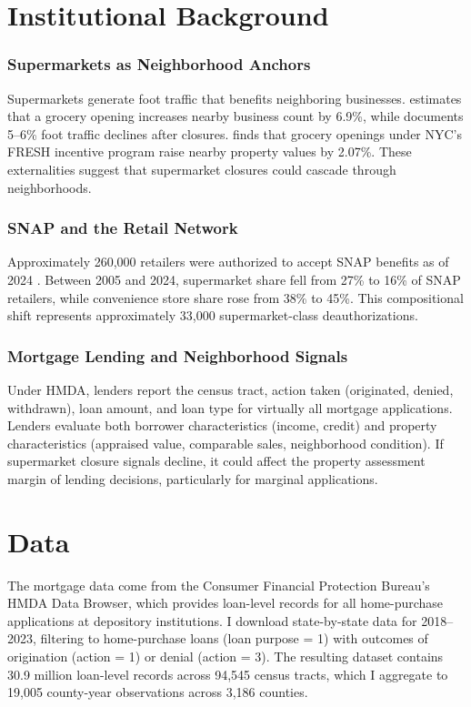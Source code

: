 \documentclass[12pt]{article}
\begin{document}
\section{Institutional Background}

\subsubsection*{Supermarkets as Neighborhood Anchors} Supermarkets generate foot traffic that benefits neighboring businesses. \citet{qian2023grocery} estimates that a grocery opening increases nearby business count by 6.9\%, while \citet{knight2022foot} documents 5--6\% foot traffic declines after closures. \citet{kolea2021fresh} finds that grocery openings under NYC's FRESH incentive program raise nearby property values by 2.07\%. These externalities suggest that supermarket closures could cascade through neighborhoods.

\subsubsection*{SNAP and the Retail Network} Approximately 260,000 retailers were authorized to accept SNAP benefits as of 2024 \citep{usda2023snap}. Between 2005 and 2024, supermarket share fell from 27\% to 16\% of SNAP retailers, while convenience store share rose from 38\% to 45\%. This compositional shift represents approximately 33,000 supermarket-class deauthorizations.

\subsubsection*{Mortgage Lending and Neighborhood Signals} Under HMDA, lenders report the census tract, action taken (originated, denied, withdrawn), loan amount, and loan type for virtually all mortgage applications. Lenders evaluate both borrower characteristics (income, credit) and property characteristics (appraised value, comparable sales, neighborhood condition). If supermarket closure signals decline, it could affect the property assessment margin of lending decisions, particularly for marginal applications.

\section{Data}

The mortgage data come from the Consumer Financial Protection Bureau's HMDA Data Browser, which provides loan-level records for all home-purchase applications at depository institutions. I download state-by-state data for 2018--2023, filtering to home-purchase loans (loan purpose = 1) with outcomes of origination (action = 1) or denial (action = 3). The resulting dataset contains 30.9 million loan-level records across 94,545 census tracts, which I aggregate to 19,005 county-year observations across 3,186 counties.
\end{document}
